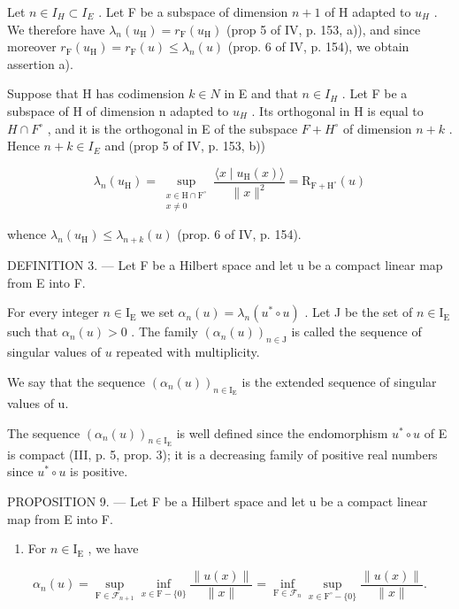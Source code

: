 Let \(n \in I_{H} \subset I_{E}\) . Let F be a subspace of dimension \(n + 1\) of H adapted to \(u_{H}\) . We therefore have \(\lambda_{n}(u_{\mathrm{H}}) = r_{\mathrm{F}}(u_{\mathrm{H}})\) (prop 5 of IV, p. 153, a)), and since moreover \(r_{\mathrm{F}}(u_{\mathrm{H}}) = r_{\mathrm{F}}(u) \leqslant \lambda_{n}(u)\) (prop. 6 of IV, p. 154), we obtain assertion a).

Suppose that H has codimension \(k \in N\) in E and that \(n \in I_{H}\) . Let F be a subspace of H of dimension n adapted to \(u_{H}\) . Its orthogonal in H is equal to \(H \cap F^{\circ}\) , and it is the orthogonal in E of the subspace \(F + H^{\circ}\) of dimension \(n + k\) . Hence \(n + k \in I_{E}\) and (prop 5 of IV, p. 153, b))

\[
\lambda_{n}(u_{\mathrm{H}}) = \sup_{\substack{x\in \mathrm{H}\cap \mathrm{F}^{\circ}\\ x\neq 0}}\frac{\langle x\mid u_{\mathrm{H}}(x)\rangle}{\|x\|^{2}} = \mathrm{R}_{\mathrm{F} + \mathrm{H}^{\circ}}(u)
\]

whence \(\lambda_{n}(u_{\mathrm{H}})\leqslant \lambda_{n + k}(u)\) (prop. 6 of IV, p. 154).

DEFINITION 3. --- Let F be a Hilbert space and let u be a compact linear map from E into F.

For every integer \(n \in \mathrm{I}_{\mathrm{E}}\) we set \(\alpha_{n}(u) = \lambda_{n}(u^{*} \circ u)\) . Let J be the set of \(n \in \mathrm{I}_{\mathrm{E}}\) such that \(\alpha_{n}(u) > 0\) . The family \((\alpha_{n}(u))_{n \in \mathrm{J}}\) is called the sequence of singular values of \(u\) repeated with multiplicity.

We say that the sequence \((\alpha_{n}(u))_{n\in\mathrm{I}_{\mathrm{E}}}\) is the extended sequence of singular values of u.

The sequence \((\alpha_{n}(u))_{n\in\mathrm{I}_{\mathrm{E}}}\) is well defined since the endomorphism \(u^{*}\circ u\) of E is compact (III, p. 5, prop. 3); it is a decreasing family of positive real numbers since \(u^{*}\circ u\) is positive.

PROPOSITION 9. --- Let F be a Hilbert space and let u be a compact linear map from E into F.

\begin{enumerate}
\def\labelenumi{\alph{enumi})}
\tightlist
\item
  For \(n \in \mathrm{I}_{\mathrm{E}}\) , we have
\end{enumerate}

\[
\alpha_ {n} (u) = \sup _ {\mathrm{F} \in \mathscr {F} _ {n + 1}} \inf _ {x \in \mathrm{F} - \{0 \}} \frac {\| u (x) \|}{\| x \|} = \inf _ {\mathrm{F} \in \mathscr {F} _ {n}} \sup _ {x \in \mathrm{F} ^ {\circ} - \{0 \}} \frac {\| u (x) \|}{\| x \|}.
\]

